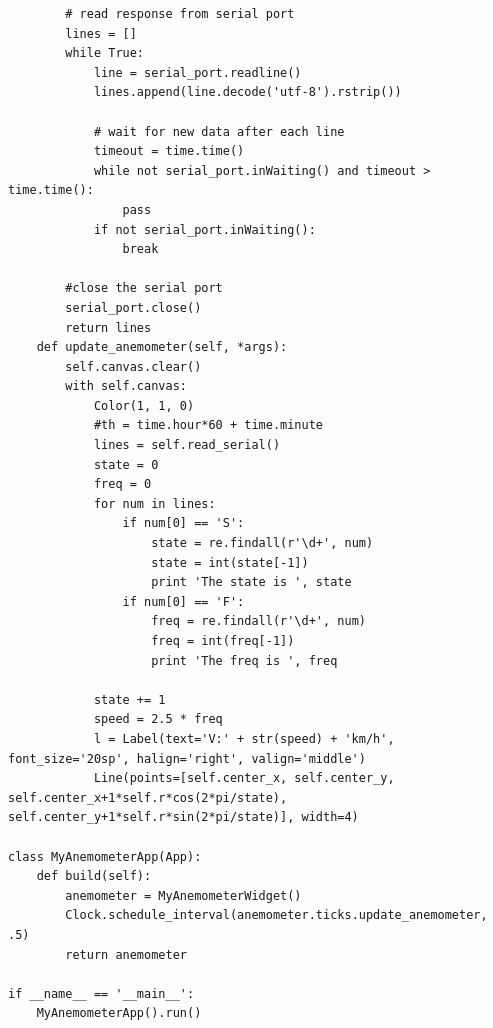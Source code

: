 \documentclass[10pt]{article}
\begin{document}
\begin{itemize}
\begin{verbatim}
        # read response from serial port
        lines = []
        while True:
            line = serial_port.readline()
            lines.append(line.decode('utf-8').rstrip())

            # wait for new data after each line
            timeout = time.time()
            while not serial_port.inWaiting() and timeout > time.time():
                pass
            if not serial_port.inWaiting():
                break 

        #close the serial port
        serial_port.close()   
        return lines
    def update_anemometer(self, *args):
        self.canvas.clear()
        with self.canvas:
            Color(1, 1, 0)
            #th = time.hour*60 + time.minute
            lines = self.read_serial()
            state = 0 
            freq = 0
            for num in lines:
                if num[0] == 'S':
                    state = re.findall(r'\d+', num)
                    state = int(state[-1])
                    print 'The state is ', state
                if num[0] == 'F':
                    freq = re.findall(r'\d+', num)
                    freq = int(freq[-1])
                    print 'The freq is ', freq

            state += 1
            speed = 2.5 * freq
            l = Label(text='V:' + str(speed) + 'km/h', font_size='20sp', halign='right', valign='middle')
            Line(points=[self.center_x, self.center_y, self.center_x+1*self.r*cos(2*pi/state), self.center_y+1*self.r*sin(2*pi/state)], width=4)

class MyAnemometerApp(App):
    def build(self):
        anemometer = MyAnemometerWidget()
        Clock.schedule_interval(anemometer.ticks.update_anemometer, .5)
        return anemometer

if __name__ == '__main__':
    MyAnemometerApp().run()


\end{verbatim}
\end{itemize}
\end{document}
